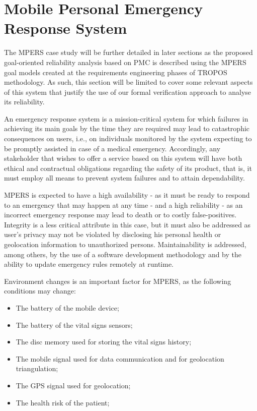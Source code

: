 \section{Mobile Personal Emergency Response System}

The MPERS case study will be further detailed in later sections as the proposed goal-oriented reliability analysis based on PMC is described using the MPERS goal models created at the requirements engineering phases of TROPOS methodology. As such, this section will be limited to cover some relevant aspects of this system that justify the use of our formal verification approach to analyse its reliability.

An emergency response system is a mission-critical system for which failures in achieving its main goals by the time they are required may lead to catastrophic consequences on users, i.e., on individuals monitored by the system expecting to be promptly assisted in case of a medical emergency. Accordingly, any stakeholder that wishes to offer a service based on this system will have both ethical and contractual obligations regarding the safety of its product, that is, it must employ all means to prevent system failures and to attain dependability.

MPERS is expected to have a high availability - as it must be ready to respond to an emergency that may happen at any time - and a high reliability - as an incorrect emergency response may lead to death or to costly false-positives. Integrity is a less critical attribute in this case, but it must also be addressed as user's privacy may not be violated by disclosing his personal health or geolocation information to unauthorized persons. Maintainability is addressed, among others, by the use of a software development methodology and by the ability to update emergency rules remotely at runtime.

Environment changes is an important factor for MPERS, as the following conditions may change:

\begin{itemize}

\item The battery of the mobile device;
\medskip

\item The battery of the vital signs sensors;
\medskip

\item The disc memory used for storing the vital signs history;

\item The mobile signal used for data communication and for geolocation triangulation;
\medskip

\item The GPS signal used for geolocation;
\medskip

\item The health risk of the patient;
\medskip

\end{itemize}



